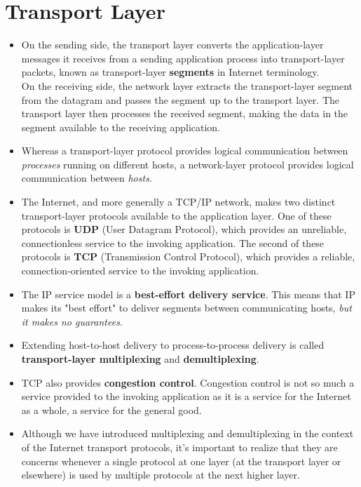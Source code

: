 \section{Transport Layer}
\begin{itemize}

\item
On the sending side, the transport layer converts the application-layer messages it receives from a sending application process into transport-layer packets, known as transport-layer \textbf{segments} in Internet terminology.\\
On the receiving side, the network layer extracts the transport-layer segment from the datagram and passes the segment up to the transport layer. The transport layer then processes the received segment, making the data in the segment available to the receiving application.

\item
Whereas a transport-layer protocol provides logical communication between \textit{processes} running on different hosts, a network-layer protocol provides logical communication between \textit{hosts}.

\item
The Internet, and more generally a TCP/IP network, makes two distinct transport-layer protocols available to the application layer. One of these protocols is \textbf{UDP} (User Datagram Protocol), which provides an unreliable, connectionless service to the invoking application. The second of these protocols is \textbf{TCP} (Transmission Control Protocol), which provides a reliable, connection-oriented service to the invoking application.

\item
The IP service model is a \textbf{best-effort delivery service}. This means that IP makes its "best effort" to deliver segments between communicating hosts, \textit{but it makes no guarantees}.

\item
Extending host-to-host delivery to process-to-process delivery is called \textbf{transport-layer multiplexing} and \textbf{demultiplexing}.

\item
TCP also provides \textbf{congestion control}. Congestion control is not so much a service provided to the invoking application as it is a service for the Internet as a whole, a service for the general good.

\item
Although we have introduced multiplexing and demultiplexing in the context of the Internet transport protocols, it's important to realize that they are concerns whenever a single protocol at one layer (at the transport layer or elsewhere) is used by multiple protocols at the next higher layer.


\end{itemize}
